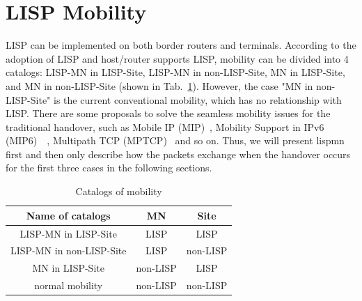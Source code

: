 \section{LISP Mobility}
\label{sec:lisp_mobility}
LISP can be implemented on both border routers and terminals. %
According to the adoption of LISP and host/router supports LISP, mobility can be divided into 4 catalogs: LISP-MN in LISP-Site, LISP-MN in non-LISP-Site, MN in LISP-Site, and MN in non-LISP-Site (shown in Tab.~\ref{mobility_catalogs}). However, the case "MN in non-LISP-Site" is the current conventional mobility, which has no relationship with LISP. There are some proposals to solve the seamless mobility issues for the traditional handover, such as Mobile IP (MIP)~\cite{perkins1997mobile}, Mobility Support in IPv6 (MIP6)~\cite{perkins2011mobility}~\cite{minolisecurity}, Multipath TCP (MPTCP)~\cite{ford2013tcp} and so on. Thus, we will present \acrshort{lispmn} first and then only describe how the packets exchange when the handover occurs for the first three cases in the following sections.

\begin{table}[!tb]
    \centering
    \caption{Catalogs of mobility}
    \label{mobility_catalogs}{
        \begin{tabular}{@{}c|c|c@{}}
			\hline\hline
    		Name of catalogs & MN  & Site    	\\  \hline 
    		LISP-MN in LISP-Site & LISP  & LISP    	\\  \hline 
    		LISP-MN in non-LISP-Site & LISP  & non-LISP    	\\  \hline    
    		MN in LISP-Site & non-LISP  & LISP    	\\  \hline    
    		normal mobility & non-LISP  & non-LISP    	\\  \hline \hline                   
    	\end{tabular}
    }
\end{table}


